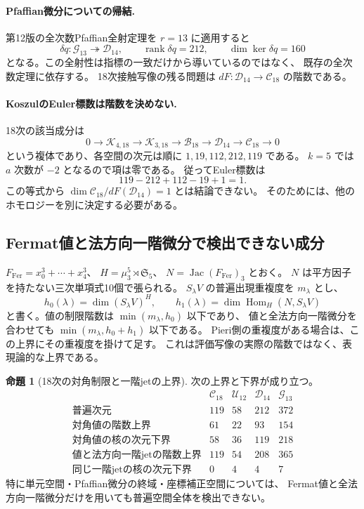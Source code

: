 \documentclass[a4paper,11pt]{ltjsarticle}
\theoremstyle{definition}
\newtheorem{proposition}[theorem]{命題}
\begin{document}
\paragraph{Pfaffian微分についての帰結.}
第12版の全次数Pfaffian全射定理を $r=13$ に適用すると
\[
 \delta q:\mathcal G_{13}\twoheadrightarrow\mathcal D_{14},
 \qquad\operatorname{rank}\delta q=212,\qquad
 \dim\ker\delta q=160
\]
となる。この全射性は指標の一致だけから導いているのではなく、
既存の全次数定理に依存する。
18次接触写像の残る問題は $dF:\mathcal D_{14}\to\mathcal C_{18}$ の階数である。

\paragraph{KoszulのEuler標数は階数を決めない.}
18次の該当成分は
\[
 0\longrightarrow\mathcal K_{4,18}
 \longrightarrow\mathcal K_{3,18}
 \longrightarrow\mathcal B_{18}
 \longrightarrow\mathcal D_{14}
 \longrightarrow\mathcal C_{18}\longrightarrow0
\]
という複体であり、各空間の次元は順に $1,19,112,212,119$ である。
$k=5$ では $a$ 次数が $-2$ となるので項は零である。
従ってEuler標数は
\[
 119-212+112-19+1=1.
\]
この等式から $\dim\mathcal C_{18}/dF(\mathcal D_{14})=1$ とは結論できない。
そのためには、他のホモロジーを別に決定する必要がある。

\subsection{Fermat値と法方向一階微分で検出できない成分}

$F_{\mathrm{Fer}}=x_0^3+\cdots+x_4^3$、
$H=\mu_3^5\rtimes\mathfrak S_5$、
$N=\operatorname{Jac}(F_{\mathrm{Fer}})_3$ とおく。
$N$ は平方因子を持たない三次単項式10個で張られる。
$S_\lambda V$ の普遍出現重複度を $m_\lambda$ とし、
\[
 h_0(\lambda)=\dim(S_\lambda V)^H,\qquad
 h_1(\lambda)=\dim\operatorname{Hom}_H(N,S_\lambda V)
\]
と書く。値の制限階数は $\min(m_\lambda,h_0)$ 以下であり、
値と全法方向一階微分を合わせても $\min(m_\lambda,h_0+h_1)$ 以下である。
Pieri側の重複度がある場合は、この上界にその重複度を掛けて足す。
これは評価写像の実際の階数ではなく、表現論的な上界である。

\begin{proposition}[18次の対角制限と一階jetの上界]
\label{prop:v14-eighteenth-visibility}
次の上界と下界が成り立つ。
\[
\begin{array}{c|rrrr}
&\mathcal C_{18}&\mathcal U_{12}&\mathcal D_{14}&\mathcal G_{13}\\\hline
\text{普遍次元}&119&58&212&372\\
\text{対角値の階数上界}&61&22&93&154\\
\text{対角値の核の次元下界}&58&36&119&218\\
\text{値と法方向一階jetの階数上界}&119&54&208&365\\
\text{同じ一階jetの核の次元下界}&0&4&4&7
\end{array}
\]
特に単元空間・Pfaffian微分の終域・座標補正空間については、
Fermat値と全法方向一階微分だけを用いても普遍空間全体を検出できない。
\end{proposition}
\end{document}
